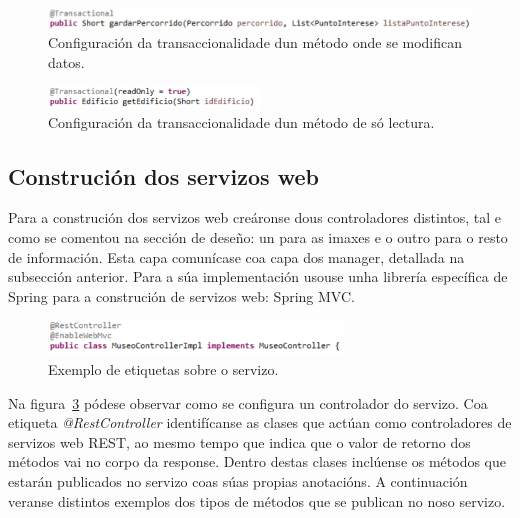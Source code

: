 \begin{figure}[tbh] 
	\begin{center}
		\includegraphics[width=1\textwidth]{figures/codigo/metodoTransaccional}
		\caption{Configuración da transaccionalidade dun método onde se modifican datos.}
		\label{fig:metodoTransaccional}
	\end{center}
\end{figure}

\begin{figure}[tbh] 
	\begin{center}
		\includegraphics[width=0.5\textwidth]{figures/codigo/metodoNonTransaccional}
		\caption{Configuración da transaccionalidade dun método de só lectura.}
		\label{fig:metodoNonTransaccional}
	\end{center}
\end{figure}


\subsection{Construción dos servizos web}
Para a construción dos servizos web creáronse dous controladores distintos, tal e como se comentou na sección de deseño: un para as imaxes e o outro para o resto de información. Esta capa comunícase coa capa dos manager, detallada na subsección anterior. Para a súa implementación usouse unha librería específica de Spring para a construción de servizos web: Spring MVC.

\begin{figure}[tbh] 
	\begin{center}
		\includegraphics[width=0.7\textwidth]{figures/codigo/controladorMuseo}
		\caption{Exemplo de etiquetas sobre o servizo.}
		\label{fig:controladorMuseo}
	\end{center}
\end{figure}

Na figura~\ref{fig:controladorMuseo} pódese observar como se configura un controlador do servizo. Coa etiqueta \emph{@RestController} identifícanse as clases que actúan como controladores de servizos web REST, ao mesmo tempo que indica que o valor de retorno dos métodos vai no corpo da response. Dentro destas clases inclúense os métodos que estarán publicados no servizo coas súas propias anotacións. A continuación veranse distintos exemplos dos tipos de métodos que se publican no noso servizo.

